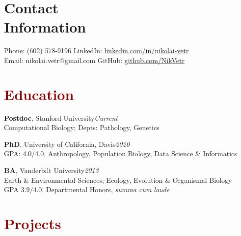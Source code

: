 \documentclass[11pt,margin,line]{resume}
\begin{document}
\name{\huge \textcolor{DarkRed}{Nikolai Vetr}}
\begin{resume}
\vspace{-5mm}
\section{\mysidestyle Contact\\Information}
    Phone: (602) 578-9196       \hfill LinkedIn: \url{linkedin.com/in/nikolai-vetr} \\
\noindent Email: nikolai.vetr@gmail.com  \hfill GitHub: \url{github.com/NikVetr} \vspace{0mm}\\\vspace{-6.5mm}

\section{\large\textcolor{DarkRed}{Education}}

\textbf{Postdoc}, Stanford University\hfill\emph{Current}\\
Computational Biology; Depts: Pathology, Genetics
\vspace{-0.25em}

   
\textbf{PhD}, University of California, Davis\hfill\emph{2020}\\
GPA: 4.0/4.0, Anthropology, Population Biology, Data Science \& Informatics
\vspace{-0.25em}

\textbf{BA}, Vanderbilt University\hfill\emph{2013}\\
Earth \& Environmental Sciences; Ecology, Evolution \& Organismal Biology\\
GPA 3.9/4.0, Departmental Honors, \textit{summa cum laude}\\
\vspace{-1.25em}

\section{\large\textcolor{DarkRed}{Projects}}


\end{resume}
\end{document}

